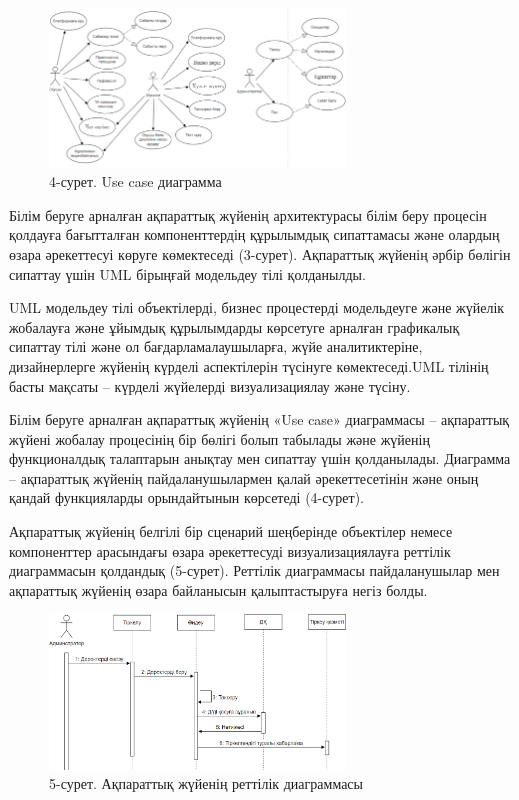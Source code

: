 \begin{figure}[H]
	\centering
	\includegraphics[width=0.7\textwidth]{media/ict/image102}
	\caption*{4-сурет. Use case диаграмма}
\end{figure}

\begin{multicols}{2}
Білім беруге арналған ақпараттық жүйенің архитектурасы білім беру
процесін қолдауға бағытталған компоненттердің құрылымдық сипаттамасы
және олардың өзара әрекеттесуі көруге көмектеседі (3-сурет). Ақпараттық
жүйенің әрбір бөлігін сипаттау үшін UML бірыңғай модельдеу тілі
қолданылды.

UML модельдеу тілі объектілерді, бизнес процестерді модельдеуге және
жүйелік жобалауға және ұйымдық құрылымдарды көрсетуге арналған
графикалық сипаттау тілі және ол бағдарламалаушыларға, жүйе
аналитиктеріне, дизайнерлерге жүйенің күрделі аспектілерін түсінуге
көмектеседі.UML тілінің басты мақсаты -- күрделі жүйелерді
визуализациялау және түсіну.

Білім беруге арналған ақпараттық жүйенің «Use case» диаграммасы --
ақпараттық жүйені жобалау процесінің бір бөлігі болып табылады және
жүйенің функционалдық талаптарын анықтау мен сипаттау үшін қолданылады.
Диаграмма -- ақпараттық жүйенің пайдаланушылармен қалай әрекеттесетінін
және оның қандай функцияларды орындайтынын көрсетеді (4-сурет).

Ақпараттық жүйенің белгілі бір сценарий шеңберінде объектілер немесе
компоненттер арасындағы өзара әрекеттесуді визуализациялауға реттілік
диаграммасын қолдандық (5-сурет). Реттілік диаграммасы пайдаланушылар
мен ақпараттық жүйенің өзара байланысын қалыптастыруға негіз болды.
\end{multicols}

\begin{figure}[H]
	\centering
	\includegraphics[width=0.7\textwidth]{media/ict/image103}
	\caption*{5-сурет. Ақпараттық жүйенің реттілік диаграммасы}
\end{figure}


